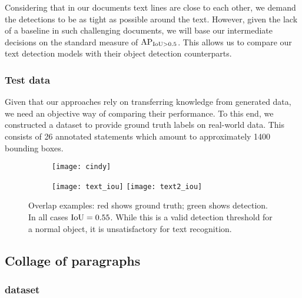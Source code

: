 		Considering that in our documents text lines are close to each other, we demand the detections to be as tight as possible around the text. However, given the lack of a baseline in such challenging documents, we will base our intermediate decisions on the standard measure of \(\operatorname{\operatorname{AP}_{\operatorname{IoU} > 0.5}}\). This allows us to compare our text detection models with their object detection counterparts.

		\subsubsection*{Test data}\label{sec:detection_test_data}

		Given that our approaches rely on transferring knowledge from generated data, we need an objective way of comparing their performance. To this end, we constructed a  dataset to provide ground truth labels on real-world data. This consists of 26 annotated statements which amount to approximately 1400 bounding boxes.

		\begin{figure}
			\begin{subfigure}[b]{0.49\linewidth}
				\texttt{[image: cindy]}
				\caption{\label{fig:cindy}}
			\end{subfigure}
			\begin{subfigure}[b]{0.49\linewidth}
				\texttt{[image: text\_iou]}
				\vspace{2em} %
				\texttt{[image: text2\_iou]}
				\caption{\label{fig:text_overlap_example}}
			\end{subfigure}
			\caption[Overlap examples]{Overlap examples: red shows ground truth; green shows detection. In all cases \(\operatorname{IoU} = 0.55\). While this is a valid detection threshold for a normal object, it is unsatisfactory for text recognition.
			}
			\label{fig:overlap_example}
		\end{figure}


	\subsection{Collage of paragraphs}
		\subsubsection*{ dataset}

